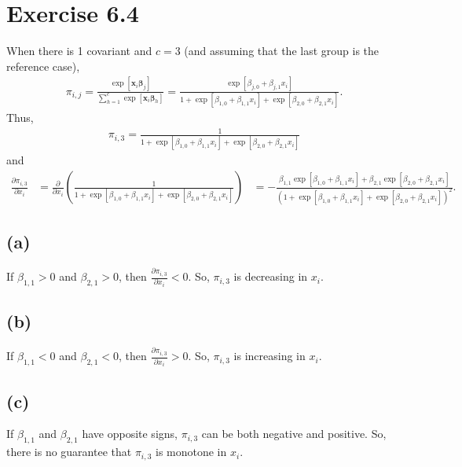 \section*{Exercise 6.4}
When there is 1 covariant and $c = 3$ (and assuming that the last group is the reference case),
\begin{align*}
\pi_{i,j} = \frac{\exp\left[\bm{x}_{i}\bm{\beta}_{j}\right]}{\sum_{h=1}^{c}\exp\left[\bm{x}_{i}\bm{\beta}_{h}\right]} = \frac{\exp\left[\beta_{j,0}+\beta_{j,1}x_{i}\right]}{1+\exp\left[\beta_{1,0}+\beta_{1,1}x_{i}\right]+\exp\left[\beta_{2,0}+\beta_{2,1}x_{i}\right]}.
\end{align*}
Thus,
\begin{align*}
\pi_{i,3} = \frac{1}{1+\exp\left[\beta_{1,0}+\beta_{1,1}x_{i}\right]+\exp\left[\beta_{2,0}+\beta_{2,1}x_{i}\right]}
\end{align*}
and
\begin{align*}
\frac{\partial \pi_{i,3}}{\partial x_{i}} &= \frac{\partial}{\partial x_{i}} \left(\frac{1}{1+\exp\left[\beta_{1,0}+\beta_{1,1}x_{i}\right]+\exp\left[\beta_{2,0}+\beta_{2,1}x_{i}\right]}\right)
&= -\frac{\beta_{1,1}\exp\left[\beta_{1,0}+\beta_{1,1}x_{i}\right]+\beta_{2,1}\exp\left[\beta_{2,0}+\beta_{2,1}x_{i}\right]}{\left(1+\exp\left[\beta_{1,0}+\beta_{1,1}x_{i}\right]+\exp\left[\beta_{2,0}+\beta_{2,1}x_{i}\right]\right)^{2}}.
\end{align*}

\subsection*{(a)}

If $\beta_{1,1} > 0$ and $\beta_{2,1} > 0$, then $\frac{\partial \pi_{i,3}}{\partial x_{i}} < 0$. So, $\pi_{i,3}$ is decreasing in $x_{i}$.
\subsection*{(b)}

If $\beta_{1,1} < 0$ and $\beta_{2,1} < 0$, then $\frac{\partial \pi_{i,3}}{\partial x_{i}} > 0$. So, $\pi_{i,3}$ is increasing in $x_{i}$.

\subsection*{(c)}
If $\beta_{1,1}$ and $\beta_{2,1}$ have opposite signs, $\pi_{i,3}$ can be both negative and positive. So, there is no guarantee that $\pi_{i,3}$ is monotone in $x_{i}$.